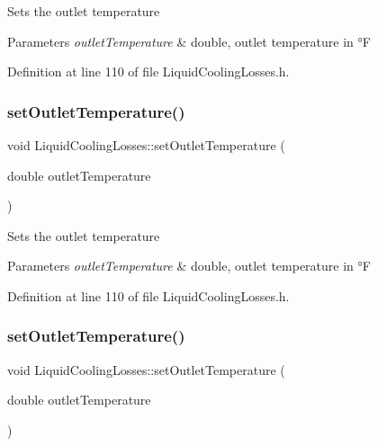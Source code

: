 Sets the outlet temperature 
\begin{DoxyParams}{Parameters}
{\em outlet\+Temperature} & double, outlet temperature in °F \\
\hline
\end{DoxyParams}


Definition at line 110 of file Liquid\+Cooling\+Losses.\+h.

\mbox{\label{class_liquid_cooling_losses_ab8ea8e748853e18fa480afa0b3e417ee}} 
\subsubsection{\texorpdfstring{set\+Outlet\+Temperature()}{setOutletTemperature()}\hspace{0.1cm}{\footnotesize\ttfamily [2/3]}}
{\footnotesize\ttfamily void Liquid\+Cooling\+Losses\+::set\+Outlet\+Temperature (\begin{DoxyParamCaption}\item[{double}]{outlet\+Temperature }\end{DoxyParamCaption})\hspace{0.3cm}{\ttfamily [inline]}}

Sets the outlet temperature 
\begin{DoxyParams}{Parameters}
{\em outlet\+Temperature} & double, outlet temperature in °F \\
\hline
\end{DoxyParams}


Definition at line 110 of file Liquid\+Cooling\+Losses.\+h.

\mbox{\label{class_liquid_cooling_losses_ab8ea8e748853e18fa480afa0b3e417ee}} 
\subsubsection{\texorpdfstring{set\+Outlet\+Temperature()}{setOutletTemperature()}\hspace{0.1cm}{\footnotesize\ttfamily [3/3]}}
{\footnotesize\ttfamily void Liquid\+Cooling\+Losses\+::set\+Outlet\+Temperature (\begin{DoxyParamCaption}\item[{double}]{outlet\+Temperature }\end{DoxyParamCaption})\hspace{0.3cm}{\ttfamily [inline]}}

